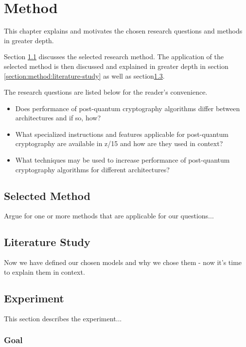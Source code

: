 \chapter{Method}
\label{chapter:method}

This chapter explains and motivates the chosen research questions and methods in greater depth.

Section \ref{section:method:selected-method} discusses the selected research method. The application of the selected method is then discussed and explained in greater depth in section \ref{section:method:literature-study} as well as section\ref{section:method:experiment}.

The research questions are listed below for the reader's convenience.

\begin{itemize}
    \item Does performance of post-quantum cryptography algorithms differ between architectures and if so, how?
    \item What specialized instructions and features applicable for post-quantum cryptography are available in z/15 and how are they used in context?
    \item What techniques may be used to increase performance of post-quantum cryptography algorithms for different architectures?
\end{itemize}

\section{Selected Method}
\label{section:method:selected-method}

Argue for one or more methods that are applicable for our questions...

\section{Literature Study}

Now we have defined our chosen models and why we chose them - now it's time to explain them in context.

\section{Experiment}
\label{section:method:experiment}

This section describes the experiment...

\subsection{Goal}

